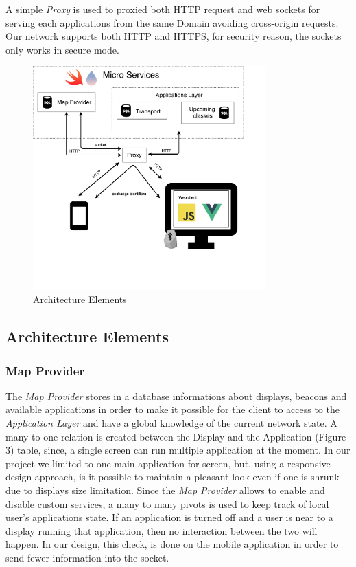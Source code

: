 \documentclass[]{usiinfbachelorproject}
\begin{document}
A simple \emph{Proxy} is used to proxied both HTTP request and web sockets for serving each applications from the same Domain avoiding cross-origin requests. Our network supports both HTTP and HTTPS, for security reason, the sockets only works in secure mode.
\begin{figure}[H]
  \centering
  \includegraphics[width=0.8\textwidth]{./images/poster_image_1.png}
    \caption{Architecture Elements}
\end{figure} 


%
\subsection{Architecture Elements}
\subsubsection{Map Provider}
The \emph{Map Provider} stores in a database informations about displays, beacons and available applications in order to make it possible for the client to access to the \emph{Application Layer} and have a global knowledge of the current network state. A many to one relation is created between the Display and the Application (Figure 3) table, since, a single screen can run multiple application at the moment. In our project we limited to one main application for screen, but, using a responsive design approach, is it possible to maintain a pleasant look even if one is shrunk due to displays size limitation. Since the \emph{Map Provider} allows to enable and disable custom services, a many to many pivots is used to keep track of local user's applications state. If an application is turned off and a user is near to a display running that application, then no interaction between the two will happen. In our design, this check, is done on the mobile application in order to send fewer information into the socket.
\end{document}

